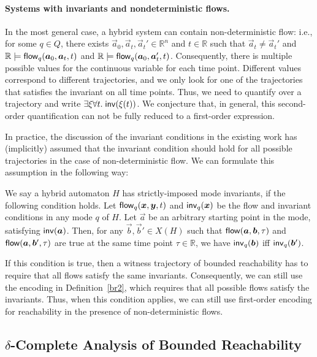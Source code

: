\documentclass[10pt,envcountsect]{llncs}
\begin{document}
\paragraph{Systems with invariants and nondeterministic flows.} In the most general case, a hybrid system can contain non-deterministic flow: i.e., for some $q\in Q$, there exists $\vec a_0, \vec a_t, \vec a_t'\in \mathbb{R}^n$ and $t\in\mathbb{R}$ such that $\vec a_t\neq \vec a_t'$ and $\mathbb{R}\models \flow_q(\vec a_0, \vec a_t, t)$ and $\mathbb{R}\models \flow_q(\vec a_0, \vec a_t', t)$. Consequently, there is multiple possible values for the continuous variable for each time point. Different values correspond to different trajectories, and we only look for one of the trajectories that satisfies the invariant on all time points. Thus, we need to quantify over a trajectory and write $\exists \xi \forall t.\; \mathsf{inv}(\xi(t))$. We conjecture that, in general, this second-order quantification can not be fully reduced to a first-order expression.

In practice, the discussion of the invariant conditions in the existing work has (implicitly) assumed that the invariant condition should hold for all possible trajectories in the case of non-deterministic flow. We can formulate this assumption in the following way:
\begin{definition}
We say a hybrid automaton $H$ has strictly-imposed mode invariants, if the following condition holds. Let $\flow_q(\vec x, \vec y, t)$ and $\inv_q(\vec x)$ be the flow and invariant conditions in any mode $q$ of $H$. Let $\vec a$ be an arbitrary starting point in the mode, satisfying $\inv(\vec a)$. Then, for any  $\vec b, \vec b'\in X(H)$ such that $\flow(\vec a, \vec b, \tau)$ and $\flow(\vec a, \vec b', \tau)$ are true at the same time point $\tau\in \mathbb{R}$, we have $\inv_q(\vec b)$ iff $\inv_q (\vec b')$.
\end{definition}
If this condition is true, then a witness trajectory of bounded reachability has to require that all flows satisfy the same invariants. Consequently, we can still use the encoding in Definition~\ref{br2}, which requires that all possible flows satisfy the invariants. Thus, when this condition applies, we can still use first-order encoding for reachability in the presence of non-deterministic flows.

\subsection{$\delta$-Complete Analysis of Bounded Reachability}
\end{document}
